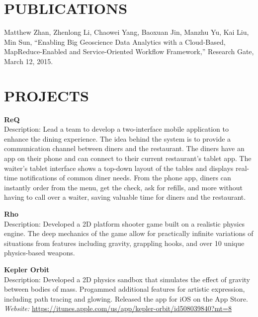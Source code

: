 \documentclass[line,margin]{res}
\begin{document}
\begin{resume}
                 \section{PUBLICATIONS}
                 Matthew Zhan, Zhenlong Li, Chaowei Yang, Baoxuan Jin, Manzhu Yu, Kai Liu, Min Sun, ``Enabling Big Geoscience Data Analytics with a Cloud-Based, MapReduce-Enabled and Service-Oriented Workflow Framework,'' Research Gate, March 12, 2015.

                 \section{PROJECTS}
                         \textbf {ReQ} \\                 
                         Description: Lead a team to develop a two-interface mobile application to enhance the dining experience. The idea behind the system is to provide a communication channel between diners and the restaurant. The diners have an app on their phone and can connect to their current restaurant's tablet app. The waiter's tablet interface shows a top-down layout of the tables and displays real-time notifications of common diner needs. From the phone app, diners can instantly order from the menu, get the check, ask for refills, and more without having to call over a waiter, saving valuable time for diners and the restaurant.

                         \textbf{Rho} \\
                         Description: Developed a 2D platform shooter game built on a realistic physics engine. The deep mechanics of the game allow for practically infinite variations of situations from features including gravity, grappling hooks, and over 10 unique physics-based weapons.

                         \textbf{Kepler Orbit} \\
                         Description: Developed a 2D physics sandbox that simulates the effect of gravity between bodies of mass. Progammed additional features for artistic expression, including path tracing and glowing. Released the app for iOS on the App Store. \\
                         \textit{Website: } \url{https://itunes.apple.com/us/app/kepler-orbit/id508039840?mt=8}
                         

\end{resume}
\end{document}
